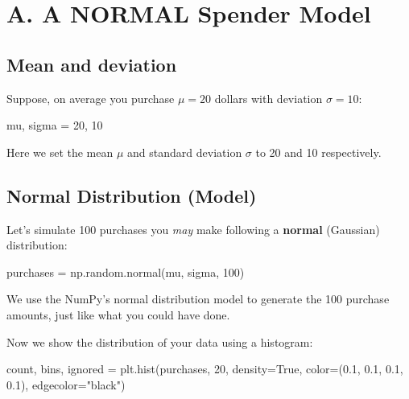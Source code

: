 \documentclass[
  letterpaper,
]{scrbook}
\newenvironment{Shaded}{\begin{snugshade}}{\end{snugshade}}
\newcommand{\DecValTok}[1]{\textcolor[rgb]{0.68,0.00,0.00}{#1}}
\newcommand{\FloatTok}[1]{\textcolor[rgb]{0.68,0.00,0.00}{#1}}
\newcommand{\NormalTok}[1]{\textcolor[rgb]{0.00,0.23,0.31}{#1}}
\newcommand{\OperatorTok}[1]{\textcolor[rgb]{0.37,0.37,0.37}{#1}}
\newcommand{\StringTok}[1]{\textcolor[rgb]{0.13,0.47,0.30}{#1}}
\newcommand{\VariableTok}[1]{\textcolor[rgb]{0.07,0.07,0.07}{#1}}
\begin{document}
\section*{A. A NORMAL Spender Model}\label{a.-a-normal-spender-model}


\subsection*{Mean and deviation}\label{mean-and-deviation}

Suppose, on average you purchase \(\mu=20\) dollars with deviation
\(\sigma=10\):

\begin{Shaded}
\begin{Highlighting}[]
\NormalTok{mu, sigma }\OperatorTok{=} \DecValTok{20}\NormalTok{, }\DecValTok{10}
\end{Highlighting}
\end{Shaded}

Here we set the mean \(\mu\) and standard deviation \(\sigma\) to 20 and
10 respectively.

\subsection*{Normal Distribution
(Model)}\label{normal-distribution-model}

Let's simulate 100 purchases you \emph{may} make following a
\textbf{normal} (Gaussian) distribution:

\begin{Shaded}
\begin{Highlighting}[]
\NormalTok{purchases }\OperatorTok{=}\NormalTok{ np.random.normal(mu, sigma, }\DecValTok{100}\NormalTok{)}
\end{Highlighting}
\end{Shaded}

We use the NumPy's normal distribution model to generate the 100
purchase amounts, just like what you could have done.

Now we show the distribution of your data using a histogram:

\begin{Shaded}
\begin{Highlighting}[]
\NormalTok{count, bins, ignored }\OperatorTok{=}\NormalTok{ plt.hist(purchases, }\DecValTok{20}\NormalTok{, density}\OperatorTok{=}\VariableTok{True}\NormalTok{, color}\OperatorTok{=}\NormalTok{(}\FloatTok{0.1}\NormalTok{, }\FloatTok{0.1}\NormalTok{, }\FloatTok{0.1}\NormalTok{, }\FloatTok{0.1}\NormalTok{), edgecolor}\OperatorTok{=}\StringTok{"black"}\NormalTok{)}
\end{Highlighting}
\end{Shaded}
\end{document}
